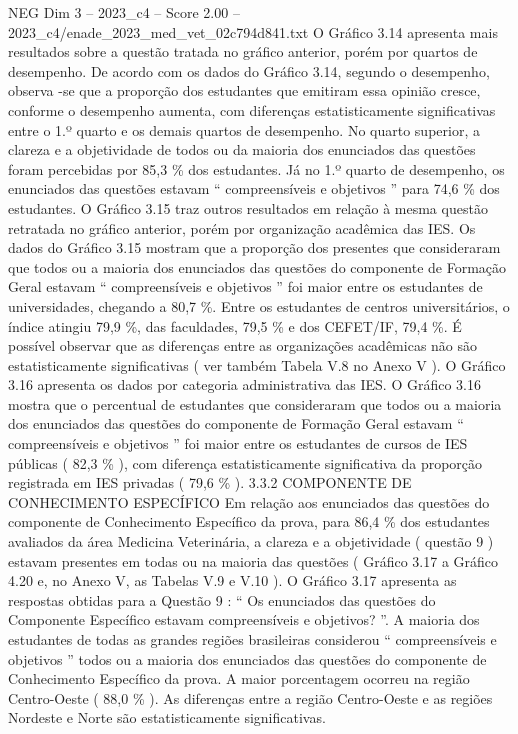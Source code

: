 \begin{textsample}{NEG Dim 3 – 2023\_c4 – Score 2.00 – 2023\_c4/enade\_2023\_med\_vet\_02c794d841.txt}
O Gráfico 3.14 apresenta mais resultados sobre a questão tratada no gráfico anterior, porém por quartos de desempenho.
De acordo com os dados do Gráfico 3.14, segundo o desempenho, observa -se que a proporção dos estudantes que emitiram essa opinião cresce, conforme o desempenho aumenta, com diferenças estatisticamente significativas entre o 1.º quarto e os demais quartos de desempenho.
No quarto superior, a clareza e a objetividade de todos ou da maioria dos enunciados das questões foram percebidas por 85,3 \% dos estudantes.
Já no 1.º quarto de desempenho, os enunciados das questões estavam “ compreensíveis e objetivos ” para 74,6 \% dos estudantes.
O Gráfico 3.15 traz outros resultados em relação à mesma questão retratada no gráfico anterior, porém por organização acadêmica das IES.
Os dados do Gráfico 3.15 mostram que a proporção dos presentes que consideraram que todos ou a maioria dos enunciados das questões do componente de Formação Geral estavam “ compreensíveis e objetivos ” foi maior entre os estudantes de universidades, chegando a 80,7 \%.
Entre os estudantes de centros universitários, o índice atingiu 79,9 \%, das faculdades, 79,5 \% e dos CEFET/IF, 79,4 \%.
É possível observar que as diferenças entre as organizações acadêmicas não são estatisticamente significativas ( ver também Tabela V.8 no Anexo V ).
O Gráfico 3.16 apresenta os dados por categoria administrativa das IES.
O Gráfico 3.16 mostra que o percentual de estudantes que consideraram que todos ou a maioria dos enunciados das questões do componente de Formação Geral estavam “ compreensíveis e objetivos ” foi maior entre os estudantes de cursos de IES públicas ( 82,3 \% ), com diferença estatisticamente significativa da proporção registrada em IES privadas ( 79,6 \% ). 3.3.2 COMPONENTE DE CONHECIMENTO ESPECÍFICO Em relação aos enunciados das questões do componente de Conhecimento Específico da prova, para 86,4 \% dos estudantes avaliados da área Medicina Veterinária, a clareza e a objetividade ( questão 9 ) estavam presentes em todas ou na maioria das questões ( Gráfico 3.17 a Gráfico 4.20 e, no Anexo V, as Tabelas V.9 e V.10 ).
O Gráfico 3.17 apresenta as respostas obtidas para a Questão 9 : “ Os enunciados das questões do Componente Específico estavam compreensíveis e objetivos? ”.
A maioria dos estudantes de todas as grandes regiões brasileiras considerou “ compreensíveis e objetivos ” todos ou a maioria dos enunciados das questões do componente de Conhecimento Específico da prova.
A maior porcentagem ocorreu na região Centro-Oeste ( 88,0 \% ).
As diferenças entre a região Centro-Oeste e as regiões Nordeste e Norte são estatisticamente significativas.

\end{textsample}
